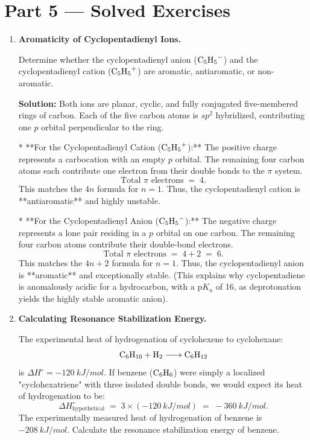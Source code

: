 \documentclass[12pt, a4paper]{book}
\begin{document}
\newpage

\section{Part 5 --- Solved Exercises}

\begin{problembox}
\begin{enumerate}[label=\textbf{E\arabic*.}]
  \item \textbf{Aromaticity of Cyclopentadienyl Ions.}
  
        Determine whether the cyclopentadienyl anion ($\ce{C5H5-}$) and the cyclopentadienyl cation ($\ce{C5H5+}$) are aromatic, antiaromatic, or non-aromatic.
        
        \textbf{Solution:}
        Both ions are planar, cyclic, and fully conjugated five-membered rings of carbon.
        Each of the five carbon atoms is $sp^2$ hybridized, contributing one $p$ orbital perpendicular to the ring.
        
        * **For the Cyclopentadienyl Cation ($\ce{C5H5+}$):**
        The positive charge represents a carbocation with an empty $p$ orbital.
        The remaining four carbon atoms each contribute one electron from their double bonds to the $\pi$ system.
        \[
          \text{Total } \pi \text{ electrons} \;=\; 4.
        \]
        This matches the $4n$ formula for $n=1$. Thus, the cyclopentadienyl cation is **antiaromatic** and highly unstable.
        
        * **For the Cyclopentadienyl Anion ($\ce{C5H5-}$):**
        The negative charge represents a lone pair residing in a $p$ orbital on one carbon.
        The remaining four carbon atoms contribute their double-bond electrons.
        \[
          \text{Total } \pi \text{ electrons} \;=\; 4 + 2 \;=\; 6.
        \]
        This matches the $4n+2$ formula for $n=1$. Thus, the cyclopentadienyl anion is **aromatic** and exceptionally stable. (This explains why cyclopentadiene is anomalously acidic for a hydrocarbon, with a $\text{p}K_a$ of 16, as deprotonation yields the highly stable aromatic anion).
        
  \item \textbf{Calculating Resonance Stabilization Energy.}
  
        The experimental heat of hydrogenation of cyclohexene to cyclohexane:
        \[
          \ce{C6H10 + H2 -> C6H12}
        \]
        is $\Delta H^\circ = -\SI{120}{kJ/mol}$.
        If benzene ($\ce{C6H6}$) were simply a localized "cyclohexatriene" with three isolated double bonds, we would expect its heat of hydrogenation to be:
        \[
          \Delta H^\circ_{\text{hypothetical}} \;=\; 3 \times (-\SI{120}{kJ/mol}) \;=\; -\SI{360}{kJ/mol}.
        \]
        The experimentally measured heat of hydrogenation of benzene is $-\SI{208}{kJ/mol}$.
        Calculate the resonance stabilization energy of benzene.
        

\end{enumerate}
\end{problembox}
\end{document}
